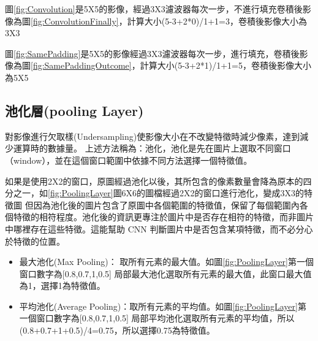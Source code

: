 圖\ref{fig:Convolution}是5X5的影像，經過3X3濾波器每次一步，不進行填充卷積後影像為圖\ref{fig:ConvolutionFinally}，計算大小(5-3+2*0)/1+1=3，卷積後影像大小為3X3


圖\ref{fig:SamePadding}是5X5的影像經過3X3濾波器每次一步，進行填充，卷積後影像為圖\ref{fig:SamePaddingOutcome}，計算大小(5-3+2*1)/1+1=5，卷積後影像大小為5X5




\subsection{池化層(pooling Layer)}
對影像進行欠取樣(Undersampling)使影像大小在不改變特徵時減少像素，達到減少運算時的數據量。
上述方法稱為：池化，池化是先在圖片上選取不同窗口（window），並在這個窗口範圍中依據不同方法選擇一個特徵值。

如果是使用2X2的窗口，原圖經過池化以後，其所包含的像素數量會降為原本的四分之一，如\ref{fig:PoolingLayer}圖6X6的圖檔經過2X2的窗口進行池化，變成3X3的特徵圖
但因為池化後的圖片包含了原圖中各個範圍的特徵值，保留了每個範圍內各個特徵的相符程度。池化後的資訊更專注於圖片中是否存在相符的特徵，而非圖片中哪裡存在這些特徵。這能幫助 CNN 判斷圖片中是否包含某項特徵，而不必分心於特徵的位置。

\begin{itemize}
	\item
	      最大池化(Max Pooling)：
取所有元素的最大值。如圖\ref{fig:PoolingLayer}第一個窗口數字為[0.8,0.7,1,0.5] 局部最大池化選取所有元素的最大值，此窗口最大值為1，選擇1為特徵值。
	\item

	      平均池化(Average Pooling)：取所有元素的平均值。如圖\ref{fig:PoolingLayer}第一個窗口數字為[0.8,0.7,1,0.5] 局部平均池化選取所有元素的平均值，所以(0.8+0.7+1+0.5)/4=0.75，所以選擇0.75為特徵值。
\end{itemize}




